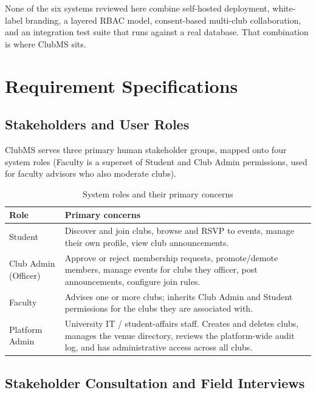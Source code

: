 \documentclass[12pt,oneside]{book}
\begin{document}
None of the six systems reviewed here combine self-hosted deployment, white-label branding, a layered RBAC model, consent-based multi-club collaboration, and an integration test suite that runs against a real database. That combination is where ClubMS sits.


\chapter{Requirement Specifications}

\section{Stakeholders and User Roles}

ClubMS serves three primary human stakeholder groups, mapped onto four system roles (Faculty is a superset of Student and Club Admin permissions, used for faculty advisors who also moderate clubs).

\begin{table}[H]
\caption{System roles and their primary concerns}
\label{tab:3.1}
\centering
\small
\begin{tabularx}{\textwidth}{@{}p{2.6cm}X@{}}
\toprule
Role & Primary concerns \\
\midrule
Student & Discover and join clubs, browse and RSVP to events, manage their own profile, view club announcements. \\
Club Admin (Officer) & Approve or reject membership requests, promote/demote members, manage events for clubs they officer, post announcements, configure join rules. \\
Faculty & Advises one or more clubs; inherits Club Admin and Student permissions for the clubs they are associated with. \\
Platform Admin & University IT / student-affairs staff. Creates and deletes clubs, manages the venue directory, reviews the platform-wide audit log, and has administrative access across all clubs. \\
\bottomrule
\end{tabularx}
\end{table}

\section{Stakeholder Consultation and Field Interviews}
\label{sec:3.2}
\end{document}
